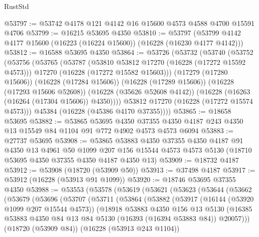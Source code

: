 \begin{lexlean}{RustStd}
\begin{coremodule}
@53797 := @53742 @4178 @121 @4142 @16 @15600 @4573 @4588 @4700 @15591 @4706
@53799 := @16215 @53695 @4350
@53810 := @53797 (@53799 @4142 @4177 @15600 (@16223 (@16224 @15600)) (@16228 (@16230 @4177 @4142)))
@53812 := @16588 @53695 @4350
@53864 := @53726
    (@53732
      (@53740
        (@53752
          (@53756
            (@53765
              (@53787
                (@53810 @53812 @17270 (@16228 (@17272 @15592 @4573)))
                @17270
                (@16228 (@17272 @15582 @15603)))
              (@17279 (@17280 @15606))
              (@16228 (@17284 @15606))
              (@16228 (@17289 @15606))
              (@16228 (@17293 @15606 @52608))
              (@16228 (@35626 @52608 @4142))
              (@16228 (@16263 (@16264 (@17304 @15606)) @4350))))
          @53812
          @17270
          (@16228 (@17272 @15574 @4573)))
        @45384
        (@16228 (@45386 @4170 @37355))))
@53865 := @18658 @53695
@53882 := @53865
    @53695
    @4350
    @37355
    @4350
    @4187
    @243
    @4350
    @13
    @15549
    @84
    @1104
    @91
    @772
    @4902
    @4573
    @4573
    @6094
@53883 := @27737 @53695
@53908 := @53865
    @53883
    @4350
    @37355
    @4350
    @4187
    @91
    @4350
    @13
    @4961
    @50
    @1099
    @207
    @156
    @15544
    @4573
    @4573
    @5130
    (@18710 @53695 @4350 @37355 @4350 @4187 @4350 @13)
@53909 := @18732 @4187
@53912 := @53908 (@18720 (@53909 @50))
@53913 := @37498 @4187
@53917 := @53912 (@16228 (@53913 @91 @1099))
@53920 := @18746 @53695 @37355 @4350
@53988 := @53553
    (@53578
      (@53619
        (@53621
          (@53623
            (@53644
              (@53662
                (@53679
                  (@53696
                    (@53707
                      (@53711
                        (@53864
                          (@53882
                            (@53917
                              (@16144 (@53920 @1099 @207 @15544 @4573))
                              (@18918
                                @53883
                                @4350
                                @156
                                @13
                                @5130
                                (@16385
                                  @53883
                                  @4350
                                  @84
                                  @13
                                  @84
                                  @5130
                                  (@16393 (@16394 @53883 @84))
                                  @20057)))
                            (@18720 (@53909 @84))
                            (@16228 (@53913 @243 @1104))

\end{coremodule}
\end{lexlean}

